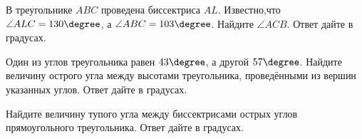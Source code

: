 %
%
\begin{homework}[number=3]
	\begin{listofex}
		\item В треугольнике \( ABC \) проведена биссектриса \( AL \). Известно,что \( \angle ALC=130\degree \),
		а \( \angle ABC =103\degree \).
		Найдите \( \angle ACB \).
		Ответ дайте в градусах.
		\item Один из углов треугольника равен \( 43\degree \), а другой \( 57\degree \).
		Найдите величину острого угла между высотами треугольника,
		проведёнными из вершин указанных углов.
		Ответ дайте в градусах.
		\item Найдите величину тупого угла между биссектрисами острых
		углов прямоугольного треугольника. Ответ дайте в градусах.
	\end{listofex}
\end{homework}
%	
%

%
%	
